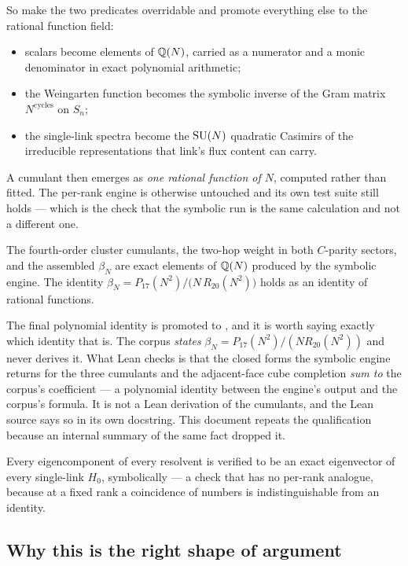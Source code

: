 So make the two predicates overridable and promote everything else to
the rational function field:
\begin{itemize}
  \item scalars become elements of $\mathbb{Q}(N)$, carried as a numerator and
    a monic denominator in exact polynomial arithmetic;
  \item the Weingarten function becomes the symbolic inverse of the
    Gram matrix $N^{\text{cycles}}$ on $S_n$;
  \item the single-link spectra become the $\mathrm{SU}(N)$ quadratic Casimirs
    of the irreducible representations that link's flux content can
    carry.
\end{itemize}

A cumulant then emerges as \emph{one rational function of $N$},
computed rather than fitted. The per-rank engine is otherwise untouched
and its own test suite still holds --- which is the check that the
symbolic run is the same calculation and not a different one.

\begin{theorem}
\label{thm:symbolic}
The fourth-order cluster cumulants, the two-hop weight in both
$C$-parity sectors, and the assembled $\beta_N$ are exact elements of
$\mathbb{Q}(N)$ produced by the symbolic engine. The identity
$\beta_N = P_{17}(N^2)\big/\big(N\,R_{20}(N^2)\big)$ holds as an
identity of rational functions.
\end{theorem}

\noindent The final polynomial identity is promoted to \Tzero{}, and it
is worth saying exactly which identity that is. The corpus \emph{states}
$\beta_N = P_{17}(N^2)/(N R_{20}(N^2))$ and never derives it. What Lean
checks is that the closed forms the symbolic engine returns for the
three cumulants and the adjacent-face cube completion \emph{sum to} the
corpus's coefficient --- a polynomial identity between the engine's
output and the corpus's formula. It is not a Lean derivation of the
cumulants, and the Lean source says so in its own docstring. This
document repeats the qualification because an internal summary of the
same fact dropped it.

Every eigencomponent of every resolvent is verified to be an exact
eigenvector of every single-link $H_0$, symbolically --- a check that
has no per-rank analogue, because at a fixed rank a coincidence of
numbers is indistinguishable from an identity.

\subsection{Why this is the right shape of argument}


